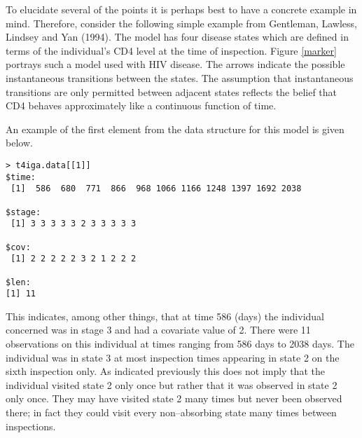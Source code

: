 \documentclass[12pt]{article}
\begin{document}
To elucidate several of the points it is perhaps best to have a concrete 
example in mind. Therefore, consider the following simple example
from Gentleman, Lawless, Lindsey and Yan (1994).
The model has four disease states which are defined in terms of the
individual's CD4 level at the time of inspection.
Figure \ref{marker} portrays such a  model used with HIV disease.
The arrows indicate the possible instantaneous transitions
between the states.
The assumption that instantaneous transitions are only permitted between 
adjacent states reflects the belief that CD4 behaves approximately 
like a continuous function of time.

An example of the first element from the data structure for this model
is given below.
\begin{verbatim}
> t4iga.data[[1]]
$time:
 [1]  586  680  771  866  968 1066 1166 1248 1397 1692 2038
 
$stage:
 [1] 3 3 3 3 3 2 3 3 3 3 3
 
$cov:
 [1] 2 2 2 2 2 3 2 1 2 2 2
 
$len:
[1] 11
\end{verbatim}

This indicates, among other things, that at time 586 (days) the individual 
concerned was in
stage 3 and had a covariate value of 2. There were 11 observations on 
this individual at times ranging from 586 days to 2038 days.
The individual was in state 3 at most inspection times appearing in state
2 on the sixth inspection only.
As indicated previously this does not imply that the individual visited 
state 2 only once but rather that it was observed in state 2 only once.
They may have visited state 2 many times but never been observed there;
in fact they could visit every non--absorbing state many times
between inspections.
\end{document}
